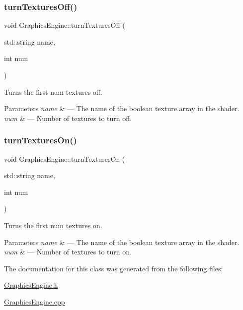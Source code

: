 \subsubsection{\texorpdfstring{turn\+Textures\+Off()}{turnTexturesOff()}}
{\footnotesize\ttfamily void Graphics\+Engine\+::turn\+Textures\+Off (\begin{DoxyParamCaption}\item[{std\+::string}]{name,  }\item[{int}]{num }\end{DoxyParamCaption})}



Turns the first num textures off. 


\begin{DoxyParams}{Parameters}
{\em name} & --- The name of the boolean texture array in the shader.\\
\hline
{\em num} & --- Number of textures to turn off. \\
\hline
\end{DoxyParams}
\mbox{\label{class_graphics_engine_a93d13fafc47d86e42a2d62b874af152d}} 
\subsubsection{\texorpdfstring{turn\+Textures\+On()}{turnTexturesOn()}}
{\footnotesize\ttfamily void Graphics\+Engine\+::turn\+Textures\+On (\begin{DoxyParamCaption}\item[{std\+::string}]{name,  }\item[{int}]{num }\end{DoxyParamCaption})}



Turns the first num textures on. 


\begin{DoxyParams}{Parameters}
{\em name} & --- The name of the boolean texture array in the shader.\\
\hline
{\em num} & --- Number of textures to turn on. \\
\hline
\end{DoxyParams}


The documentation for this class was generated from the following files\+:\begin{DoxyCompactItemize}
\item 
\hyperlink{_graphics_engine_8h}{Graphics\+Engine.\+h}\item 
\hyperlink{_graphics_engine_8cpp}{Graphics\+Engine.\+cpp}\end{DoxyCompactItemize}
